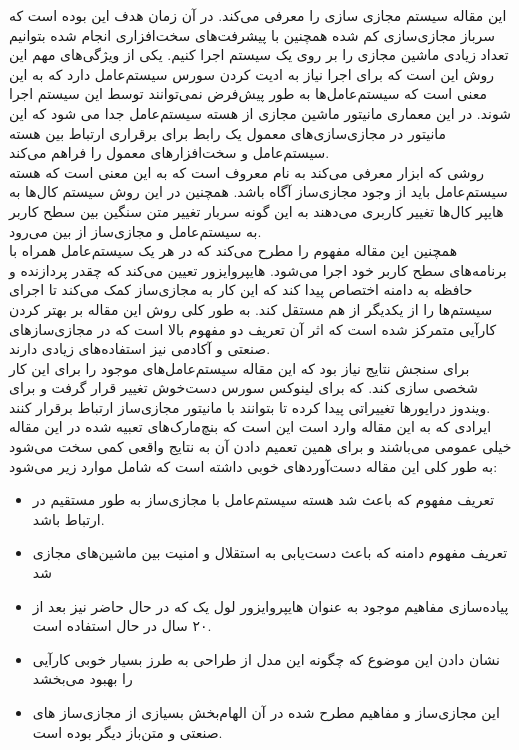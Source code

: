 \documentclass[a4paper, 12pt]{article}
\title{\lr{Xen and the Art of Virtualization}}
\author{حسین افکار}
\begin{document}
\maketitle
این مقاله سیستم مجازی سازی
را معرفی می‌کند.
در آن زمان هدف این بوده است که سرباز مجازی‌سازی کم شده همچنین با پیشرفت‌های سخت‌افزاری انجام
شده بتوانیم تعداد زیادی ماشین مجازی را بر روی یک سیستم اجرا کنیم.
یکی از ویژگی‌های مهم این روش این است که برای اجرا نیاز به ادیت کردن سورس سیستم‌عامل دارد
که به این معنی است که سیستم‌عامل‌ها به طور پیش‌فرض نمی‌توانند توسط این سیستم اجرا شوند.
در این معماری مانیتور ماشین مجازی از هسته سیستم‌عامل جدا می شود که این
مانیتور در مجازی‌سازی‌های معمول یک رابط برای برقراری ارتباط بین هسته سیستم‌عامل و
سخت‌افزار‌های معمول را فراهم می‌کند. \\
روشی که ابزار
معرفی می‌کند به نام
معروف است که به این معنی است که هسته سیستم‌عامل باید از وجود مجازی‌ساز آگاه باشد.
همچنین در این روش سیستم کال‌ها به هایپر کال‌ها تغییر کاربری می‌دهند به این گونه
سربار تغییر متن سنگین بین سطح کاربر به سیستم‌عامل و مجازی‌ساز از بین می‌رود. \\
همچنین این مقاله مفهوم
را مطرح می‌کند که در هر
یک سیستم‌عامل همراه با برنامه‌های سطح کاربر خود اجرا می‌شود.
هایپروایزور تعیین می‌کند که چقدر پردازنده و حافظه به دامنه اختصاص پیدا کند که این کار به مجازی‌ساز کمک می‌کند
تا اجرای سیستم‌ها را از یکدیگر از هم مستقل کند.
به طور کلی روش این مقاله بر بهتر کردن کارآیی متمرکز شده است که اثر آن تعریف دو
مفهوم بالا است که در مجازی‌ساز‌های صنعتی و آکادمی نیز استفاده‌های زیادی دارند. \\
برای سنجش نتایج نیاز بود که این مقاله سیستم‌عامل‌های موجود را برای این کار شخصی سازی کند.
که برای لینوکس سورس دست‌خوش تغییر قرار گرفت و برای ویندوز
درایور‌ها تغییراتی پیدا کرده تا بتوانند با مانیتور مجازی‌ساز ارتباط برقرار کنند. \\
ایرادی که به این مقاله وارد است این است که بنچ‌مارک‌های تعبیه شده در این مقاله خیلی عمومی
می‌باشند و برای همین تعمیم دادن آن به نتایج واقعی کمی سخت می‌شود
به طور کلی این مقاله دست‌آورد‌های خوبی داشته است که شامل موارد زیر می‌شود:
\begin{itemize}
    \item تعریف مفهوم
    که باعث شد هسته سیستم‌عامل با مجازی‌ساز به طور مستقیم در ارتباط باشد.
    \item تعریف مفهوم دامنه که باعث دست‌یابی به استقلال و امنیت بین ماشین‌های مجازی شد
    \item پیاده‌سازی مفاهیم موجود به عنوان هایپروایزور لول یک که در حال حاضر نیز بعد از ۲۰ سال
    در حال استفاده است.
    \item نشان دادن این موضوع که چگونه این مدل از طراحی به طرز بسیار خوبی کارآیی را بهبود می‌بخشد
    \item این مجازی‌ساز و مفاهیم مطرح شده در آن الهام‌بخش بسیازی از مجازی‌ساز های صنعتی
    و متن‌باز دیگر بوده است.
\end{itemize}
\end{document}

